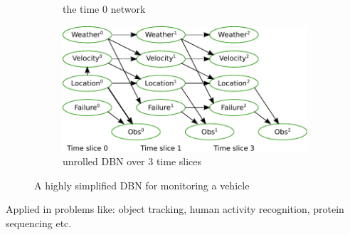 \begin{frame}[t]
\begin{figure}
\begin{subfigure}[b]{0.33\textwidth}
  			\caption{\tiny{the time 0 network}}
  			\label{fig:zeroDBN}
  		\end{subfigure}
  		\begin{subfigure}[b]{0.39\textwidth}
			\centering
			\includegraphics[width=\textwidth]{dbn-vehicle/unrolled.pdf} 
  			\caption{\tiny{unrolled DBN over 3 time slices}}
  			\label{fig:unrolledDBN}
  		\end{subfigure}
  		\caption{\tiny{A highly simplified DBN for monitoring a vehicle \parencite{KollerFriedman09}}}
  		\label{fig:DBN}
  	\end{figure}
  	
  	Applied in problems like: object tracking, human activity recognition, protein sequencing etc.
\end{frame}


